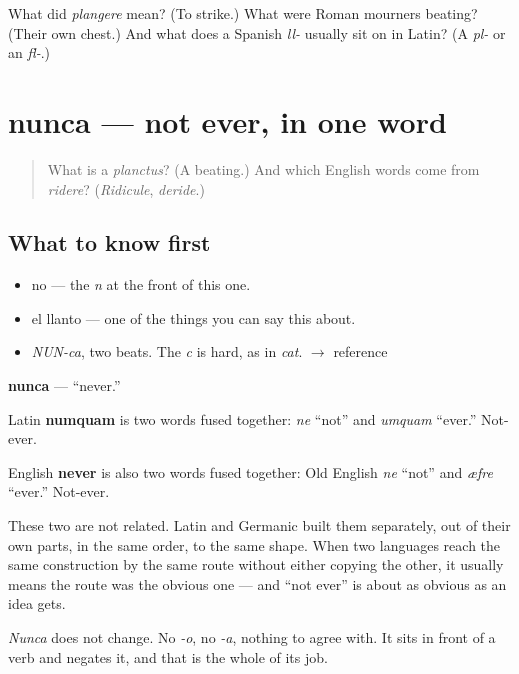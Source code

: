 \begin{tcolorbox}[breakable,colback=teal!4,colframe=teal!35!black,title={Before you move on}]
What did \emph{plangere} mean? (To strike.) What were Roman mourners beating? (Their own chest.) And what does a Spanish \emph{ll-} usually sit on in Latin? (A \emph{pl-} or an \emph{fl-}.)
\end{tcolorbox}
\section[nunca]{nunca — not ever, in one word}

\label{lesson:ES-C316-nunca}



\begin{quote}
What is a \emph{planctus}? (A beating.) And which English words come from \emph{ridere}? (\emph{Ridicule}, \emph{deride}.)
\end{quote}

\subsection*{What to know first}
\begin{itemize}
\raggedright
  \item no — the \emph{n} at the front of this one.
  \item el llanto — one of the things you can say this about.
\end{itemize}

\begin{sounds}
\begin{itemize}
\raggedright
  \item \emph{NUN-ca}, two beats. The \emph{c} is hard, as in \emph{cat}. $\to$ reference
\end{itemize}
\end{sounds}

\begin{cousinweb}
\textbf{nunca} — \textquotedblleft{}never.\textquotedblright{}

Latin \textbf{numquam} is two words fused together: \emph{ne} \textquotedblleft{}not\textquotedblright{} and \emph{umquam} \textquotedblleft{}ever.\textquotedblright{} Not-ever.

English \textbf{never} is also two words fused together: Old English \emph{ne} \textquotedblleft{}not\textquotedblright{} and \emph{æfre} \textquotedblleft{}ever.\textquotedblright{} Not-ever.

These two are not related. Latin and Germanic built them separately, out of their own parts, in the same order, to the same shape. When two languages reach the same construction by the same route without either copying the other, it usually means the route was the obvious one — and \textquotedblleft{}not ever\textquotedblright{} is about as obvious as an idea gets.

\emph{Nunca} does not change. No \emph{-o}, no \emph{-a}, nothing to agree with. It sits in front of a verb and negates it, and that is the whole of its job.
\end{cousinweb}

